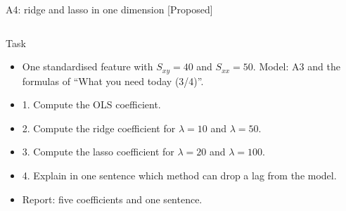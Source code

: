 \begin{frame}{A4: ridge and lasso in one dimension [Proposed]}
\propsub
\itemsize{\scriptsize}
\begin{columns}[T]
\begin{column}{\taskw}
\begin{block}{Task}
\begin{itemize}
    \item One standardised feature with $S_{xy} = 40$ and $S_{xx} = 50$. Model: A3 and the formulas of ``What you need today (3/4)''.
    \item 1. Compute the OLS coefficient.
    \item 2. Compute the ridge coefficient for $\lambda = 10$ and $\lambda = 50$.
    \item 3. Compute the lasso coefficient for $\lambda = 20$ and $\lambda = 100$.
    \item 4. Explain in one sentence which method can drop a lag from the model.
    \item Report: five coefficients and one sentence.
\end{itemize}
\end{block}
\end{column}
\begin{column}{\solw}
\end{column}
\end{columns}
\end{frame}

